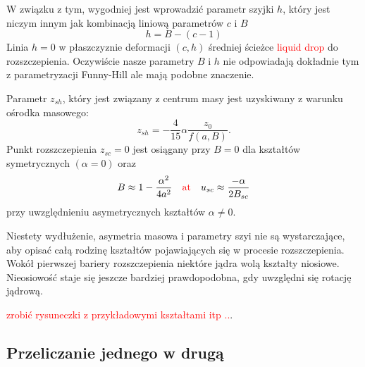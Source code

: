 \documentclass[polish]{article}
\numberwithin{equation}{section}
\begin{document}
W związku z tym, wygodniej jest wprowadzić parametr szyjki $h$, który jest niczym innym jak kombinacją liniową parametrów $c$ i $B$
\begin{equation}
h=B-(c-1)
\end{equation}
Linia $h=0$ w płaszczyznie deformacji $(c,h)$ średniej ścieżce \textcolor{red}{liquid drop} do 	rozszczepienia. Oczywiście nasze parametry $B$ i $h$ nie odpowiadają dokładnie tym z parametryzacji Funny-Hill ale mają podobne znaczenie.

Parametr $z_{sh}$, który jest związany z centrum masy jest uzyskiwany z warunku ośrodka masowego:
\begin{equation}
z_{sh}=-\frac{4}{15}\alpha \frac{z_{0}}{f(a,B)}.
\end{equation}
Punkt rozszczepienia $z_{sc}=0$ jest osiągany przy $B=0$ dla kształtów symetrycznych $(\alpha=0)$ oraz
\begin{equation}
B\approx 1-\frac{\alpha^{2}}{4a^{2}} \quad \textcolor{red}{\textrm{at}} \quad u_{sc}\approx \frac{-\alpha}{2B_{sc}}
\end{equation}
przy uwzględnieniu asymetrycznych kształtów $\alpha\neq 0$.

Niestety wydłużenie, asymetria masowa i parametry szyi nie są wystarczające, aby opisać całą rodzinę kształtów pojawiających się w procesie rozszczepienia. Wokół pierwszej bariery rozszczepienia niektóre jądra wolą kształty niosiowe. Nieosiowość staje się jeszcze bardziej prawdopodobna, gdy uwzględni się rotację jądrową.

\bigskip
\textcolor{red}{zrobić rysuneczki z przykładowymi kształtami itp ..}.

\subsection{Przeliczanie jednego w drugą}
\end{document}
